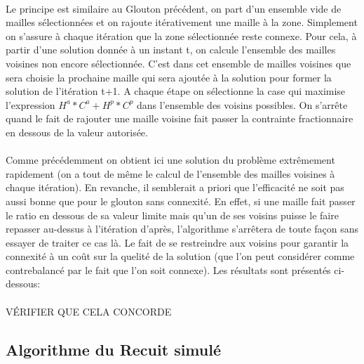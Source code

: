 \documentclass[a4paper, 11pt]{article} %
\begin{document}
\paragraph*{}
Le principe est similaire au Glouton précédent, on part d'un ensemble vide de mailles sélectionnées et on rajoute itérativement une maille à la zone. Simplement on s'assure à chaque itération que la zone sélectionnée reste connexe. Pour cela, à partir d'une solution donnée à un instant t, on calcule l'ensemble des mailles voisines non encore sélectionnée. C'est dans cet ensemble de mailles voisines que sera choisie la prochaine maille qui sera ajoutée à la solution pour former la solution de l'itération t+1. A chaque étape on sélectionne la case qui maximise l'expression $H^a*C^a+H^p*C^p$ dans l'ensemble des voisins possibles. On s'arrête quand le fait de rajouter une maille voisine fait passer la contrainte fractionnaire en dessous de la valeur autorisée.

\paragraph*{}
Comme précédemment on obtient ici une solution du problème extrêmement rapidement (on a tout de même le calcul de l'ensemble des mailles voisines à chaque itération). En revanche, il semblerait a priori que l'efficacité ne soit pas aussi bonne que pour le glouton sans connexité. En effet, si une maille fait passer le ratio en dessous de sa valeur limite mais qu'un de ses voisins puisse le faire repasser au-dessus à l'itération d'après, l'algorithme s'arrêtera de toute façon sans essayer de traiter ce cas là. Le fait de se restreindre aux voisins pour garantir la connexité à un coût sur la quelité de la solution (que l'on peut considérer comme contrebalancé par le fait que l'on soit connexe). Les résultats sont présentés ci-dessous:
 
\paragraph*{}
VÉRIFIER QUE CELA CONCORDE 


\subsection{Algorithme du Recuit simulé}
\end{document}
